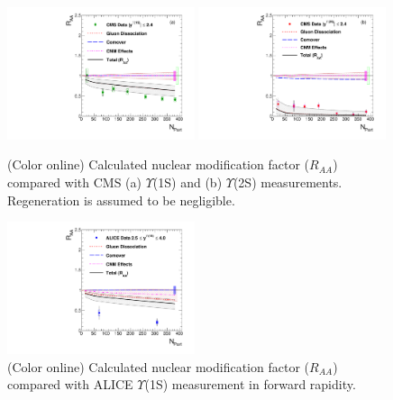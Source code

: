 \documentclass[review]{elsarticle}
\begin{document}
{  
  \begin{figure}
    \includegraphics[width=0.49\textwidth]{Figures/Quarkonia_276TeV/Fig8a_CMS_Y1SRAANPart.pdf}
    \includegraphics[width=0.49\textwidth]{Figures/Quarkonia_276TeV/Fig8b_CMS_Y2SRAANPart.pdf}
    \caption{(Color online) Calculated nuclear modification factor ($R_{AA}$) compared with CMS 
      (a) $\Upsilon$(1S) and (b) $\Upsilon$(2S) measurements. Regeneration is assumed to be negligible. }
    \label{fig:UpsilonRaa}
  \end{figure}
  \begin{figure}
    \includegraphics[width=0.49\textwidth]{Figures/Quarkonia_276TeV/Fig9_ALICE_Y1SRAANPart.pdf}
    \caption{(Color online) Calculated nuclear modification factor ($R_{AA}$) compared with 
      ALICE $\Upsilon$(1S) measurement in forward rapidity.}
    \label{fig:ALICERaaY}
  \end{figure}




}
\end{document}
